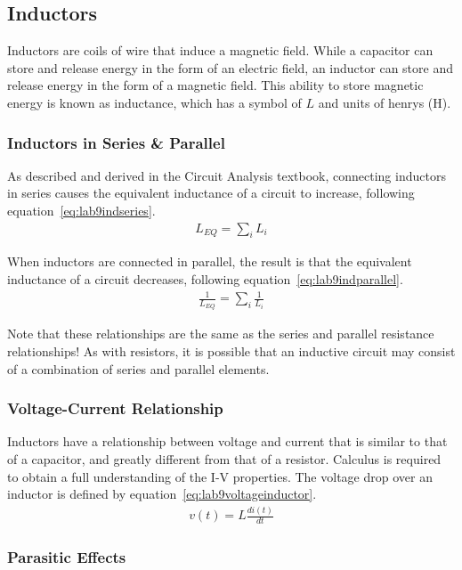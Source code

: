\subsection{Inductors}
Inductors are coils of wire that induce a magnetic field. While a capacitor can store and release energy in the form of an electric field, an inductor can store and release energy in the form of a magnetic field. This ability to store magnetic energy is known as inductance, which has a symbol of $L$ and units of henrys (H). 

\subsubsection{Inductors in Series \& Parallel}

As described and derived in the Circuit Analysis textbook, connecting inductors in series causes the equivalent inductance of a circuit to increase, following equation~\ref{eq:lab9indseries}.
\begin{gather}
	L_{EQ} = \sum_i L_i
	\label{eq:lab9indseries}
\end{gather}

When inductors are connected in parallel, the result is that the equivalent inductance of a circuit decreases, following equation~\ref{eq:lab9indparallel}.
\begin{gather}
	\frac{1}{L_{EQ}} = \sum_i \frac{1}{L_i}
	\label{eq:lab9indparallel}
\end{gather}


Note that these relationships are the same as the series and parallel resistance relationships! As with resistors, it is possible that an inductive circuit may consist of a combination of series and parallel elements.

\subsubsection{Voltage-Current Relationship}
Inductors have a relationship between voltage and current that is similar to that of a capacitor, and greatly different from that of a resistor. Calculus is required to obtain a full understanding of the I-V properties. The voltage drop over an inductor is defined by equation~\ref{eq:lab9voltageinductor}.
\begin{gather}
	v(t) = L\frac{di(t)}{dt}
	\label{eq:lab9voltageinductor}
\end{gather}

\subsubsection{Parasitic Effects}

